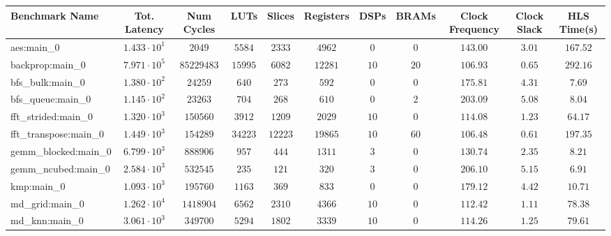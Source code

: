 \begin{tabular}{|l|c|c|c|c|c|c|c|c|c|c|}
\hline
Benchmark Name         & Tot. Latency           & Num Cycles   & LUTs      & Slices    & Registers & DSPs    & BRAMs  & Clock Frequency & Clock Slack & HLS Time(s) \\
\hline
aes:main\_0            & $ 1.433 \cdot 10^{1} $ & $ 2049     $ & $ 5584  $ & $ 2333  $ & $ 4962  $ & $ 0   $ & $ 0  $ & $ 143.00      $ & $ 3.01    $ & $ 167.52  $ \\
backprop:main\_0       & $ 7.971 \cdot 10^{5} $ & $ 85229483 $ & $ 15995 $ & $ 6082  $ & $ 12281 $ & $ 10  $ & $ 20 $ & $ 106.93      $ & $ 0.65    $ & $ 292.16  $ \\
bfs\_bulk:main\_0      & $ 1.380 \cdot 10^{2} $ & $ 24259    $ & $ 640   $ & $ 273   $ & $ 592   $ & $ 0   $ & $ 0  $ & $ 175.81      $ & $ 4.31    $ & $ 7.69    $ \\
bfs\_queue:main\_0     & $ 1.145 \cdot 10^{2} $ & $ 23263    $ & $ 704   $ & $ 268   $ & $ 610   $ & $ 0   $ & $ 2  $ & $ 203.09      $ & $ 5.08    $ & $ 8.04    $ \\
fft\_strided:main\_0   & $ 1.320 \cdot 10^{3} $ & $ 150560   $ & $ 3912  $ & $ 1209  $ & $ 2029  $ & $ 10  $ & $ 0  $ & $ 114.08      $ & $ 1.23    $ & $ 64.17   $ \\
fft\_transpose:main\_0 & $ 1.449 \cdot 10^{3} $ & $ 154289   $ & $ 34223 $ & $ 12223 $ & $ 19865 $ & $ 10  $ & $ 60 $ & $ 106.48      $ & $ 0.61    $ & $ 197.35  $ \\
gemm\_blocked:main\_0  & $ 6.799 \cdot 10^{3} $ & $ 888906   $ & $ 957   $ & $ 444   $ & $ 1311  $ & $ 3   $ & $ 0  $ & $ 130.74      $ & $ 2.35    $ & $ 8.21    $ \\
gemm\_ncubed:main\_0   & $ 2.584 \cdot 10^{3} $ & $ 532545   $ & $ 235   $ & $ 121   $ & $ 320   $ & $ 3   $ & $ 0  $ & $ 206.10      $ & $ 5.15    $ & $ 6.91    $ \\
kmp:main\_0            & $ 1.093 \cdot 10^{3} $ & $ 195760   $ & $ 1163  $ & $ 369   $ & $ 833   $ & $ 0   $ & $ 0  $ & $ 179.12      $ & $ 4.42    $ & $ 10.71   $ \\
md\_grid:main\_0       & $ 1.262 \cdot 10^{4} $ & $ 1418904  $ & $ 6562  $ & $ 2310  $ & $ 4366  $ & $ 10  $ & $ 0  $ & $ 112.42      $ & $ 1.11    $ & $ 78.38   $ \\
md\_knn:main\_0        & $ 3.061 \cdot 10^{3} $ & $ 349700   $ & $ 5294  $ & $ 1802  $ & $ 3339  $ & $ 10  $ & $ 0  $ & $ 114.26      $ & $ 1.25    $ & $ 79.61   $ \\

\end{tabular}
